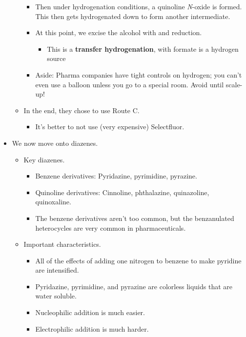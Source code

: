\documentclass[../notes.tex]{subfiles}
\begin{document}
\begin{itemize}
\begin{itemize}
\begin{itemize}
            \item Then under hydrogenation conditions, a quinoline \emph{N}-oxide is formed. This then gets hydrogenated down to form another intermediate.
            \item At this point, we excise the alcohol  with  and reduction.
            \begin{itemize}
                \item This is a \textbf{transfer hydrogenation}, with formate is a hydrogen source
            \end{itemize}
            \item Aside: Pharma companies have tight controls on hydrogen; you can't even use a balloon unless you go to a special room. Avoid until scale-up!
        \end{itemize}
        \item In the end, they chose to use Route C.
        \begin{itemize}
            \item It's better to not use (very expensive) Selectfluor.
        \end{itemize}
    \end{itemize}
    \item We now move onto diazenes.
    \begin{itemize}
        \item Key diazenes.
        \begin{itemize}
            \item Benzene derivatives: Pyridazine, pyrimidine, pyrazine.
            \item Quinoline derivatives: Cinnoline, phthalazine, quinazoline, quinoxaline.
            \item The benzene derivatives aren't too common, but the benzanulated heterocycles are very common in pharmaceuticals.
        \end{itemize}
        \item Important characteristics.
        \begin{itemize}
            \item All of the effects of adding one nitrogen to benzene to make pyridine are intensified.
            \item Pyridazine, pyrimidine, and pyrazine are colorless liquids that are water soluble.
            \item Nucleophilic addition is much easier.
            \item Electrophilic addition is much harder.

\end{itemize}
\end{itemize}
\end{itemize}
\end{document}
